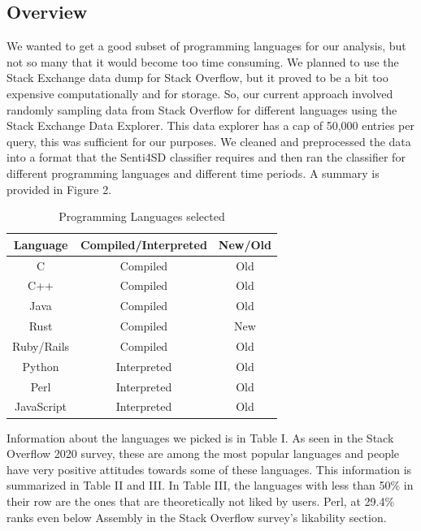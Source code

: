 \documentclass[conference]{IEEEtran}
\begin{document}
\subsection{Overview}
We wanted to get a good subset of programming languages for our analysis, but not so many that it would become too time consuming. We planned to use the Stack Exchange data dump for Stack Overflow, but it proved to be a bit too expensive computationally and for storage. So, our current approach involved randomly sampling data from Stack Overflow for different languages using the Stack Exchange Data Explorer\cite{b28}. This data explorer has a cap of 50,000 entries per query, this was sufficient for our purposes. We cleaned and preprocessed the data into a format that the Senti4SD classifier requires and then ran the classifier for different programming languages and different time periods. A summary is provided in Figure 2.\\

\begin{table}[htbp]
\caption{Programming Languages selected}
\begin{center}
\begin{tabular}{|c|c|c|}
\hline
\textbf{Language}&\textbf{Compiled/Interpreted}& \textbf{New/Old}\\
\hline
C&Compiled&Old\\
\hline
C++&Compiled&Old\\
\hline
Java&Compiled&Old\\
\hline
Rust&Compiled&New\\
\hline
Ruby/Rails&Compiled&Old\\
\hline
Python&Interpreted&Old\\
\hline
Perl&Interpreted&Old\\
\hline
JavaScript&Interpreted&Old\\
\hline
\end{tabular}
\label{tab1}
\end{center}
\end{table}

Information about the languages we picked is in Table I. As seen in the Stack Overflow 2020 survey\cite{b29}, these are among the most popular languages and people have very positive attitudes towards some of these languages. This information is summarized in Table II and III. In Table III, the languages with less than 50\% in their row are the ones that are theoretically not liked by users. Perl, at 29.4\% ranks even below Assembly in the Stack Overflow survey's likability section.\\
\end{document}
